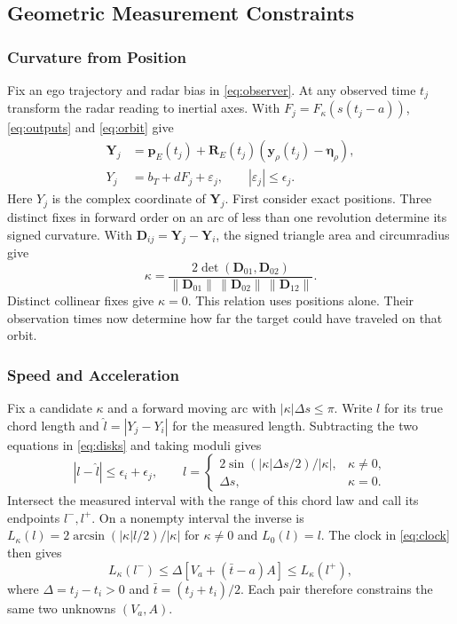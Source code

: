 \documentclass[journal]{IEEEtran}
\theoremstyle{definition}
\newcommand{\vct}[1]{\boldsymbol{#1}}
\newcommand{\mtx}[1]{\mathbf{#1}}
\begin{document}
\subsection{Geometric Measurement Constraints}
\subsubsection{Curvature from Position}
Fix an ego trajectory and radar bias in \eqref{eq:observer}.
At any observed time $t_j$ transform the radar reading to inertial axes.
With $F_j=F_\kappa(s(t_j-a))$, \eqref{eq:outputs} and \eqref{eq:orbit}
give
\begin{equation}\label{eq:disks}
\begin{aligned}
 \vct Y_j &= \vct p_E(t_j)+\mtx R_E(t_j)(\vct y_\rho(t_j)-\vct\eta_\rho),\\
 Y_j &= b_T+dF_j+\varepsilon_j,\qquad |\varepsilon_j|\le\epsilon_j .
\end{aligned}
\end{equation}
Here $Y_j$ is the complex coordinate of $\vct Y_j$. First consider exact
positions. Three distinct fixes in forward order on an arc of less than
one revolution determine its signed curvature. With
$\vct D_{ij}=\vct Y_j-\vct Y_i$, the signed triangle area and circumradius give
\begin{equation*}
 \kappa=\frac{2\det(\vct D_{01},\vct D_{02})}
              {\|\vct D_{01}\|\,\|\vct D_{02}\|\,\|\vct D_{12}\|}.
\end{equation*}
Distinct collinear fixes give $\kappa=0$. This relation uses positions
alone. Their observation times now determine how far the target could
have traveled on that orbit.

\subsubsection{Speed and Acceleration}
Fix a candidate $\kappa$ and a forward moving arc with
$|\kappa|\Delta s\le\pi$. Write $l$ for its true chord length and
$\hat l=|Y_j-Y_i|$ for the measured length. Subtracting the two
equations in \eqref{eq:disks} and taking moduli gives
\begin{equation*}
 |l-\hat l|\le\epsilon_i+\epsilon_j,\qquad
 l=\begin{cases}
 2\sin(|\kappa|\Delta s/2)/|\kappa|,&\kappa\ne0,\\
 \Delta s,&\kappa=0 .
 \end{cases}
\end{equation*}
Intersect the measured interval with the range of this chord law and
call its endpoints $l^-,l^+$. On a nonempty interval the inverse is
$L_\kappa(l)=2\arcsin(|\kappa|l/2)/|\kappa|$ for $\kappa\ne0$
and $L_0(l)=l$. The clock in \eqref{eq:clock} then gives
\begin{equation}\label{eq:clockstrip}
 L_\kappa(l^-)\le\Delta[V_a+(\bar t-a)A]\le L_\kappa(l^+),
\end{equation}
where $\Delta=t_j-t_i>0$ and $\bar t=(t_j+t_i)/2$.
Each pair therefore constrains the same two unknowns $(V_a,A)$.
\end{document}
